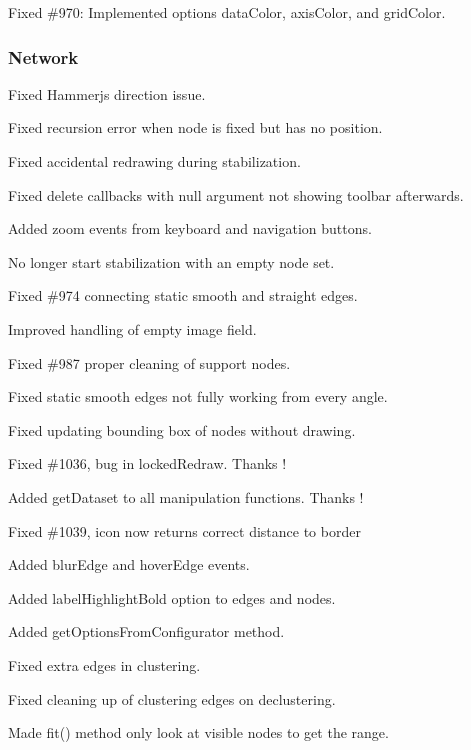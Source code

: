 \begin{DoxyItemize}
\item Fixed \#970\+: Implemented options {\ttfamily data\+Color}, {\ttfamily axis\+Color}, and {\ttfamily grid\+Color}.
\end{DoxyItemize}

\subsubsection*{Network}


\begin{DoxyItemize}
\item Fixed Hammerjs direction issue.
\item Fixed recursion error when node is fixed but has no position.
\item Fixed accidental redrawing during stabilization.
\item Fixed delete callbacks with null argument not showing toolbar afterwards.
\item Added zoom events from keyboard and navigation buttons.
\item No longer start stabilization with an empty node set.
\item Fixed \#974 connecting static smooth and straight edges.
\item Improved handling of empty image field.
\item Fixed \#987 proper cleaning of support nodes.
\item Fixed static smooth edges not fully working from every angle.
\item Fixed updating bounding box of nodes without drawing.
\item Fixed \#1036, bug in locked\+Redraw. Thanks !
\item Added get\+Dataset to all manipulation functions. Thanks !
\item Fixed \#1039, icon now returns correct distance to border
\item Added blur\+Edge and hover\+Edge events.
\item Added label\+Highlight\+Bold option to edges and nodes.
\item Added get\+Options\+From\+Configurator method.
\item Fixed extra edges in clustering.
\item Fixed cleaning up of clustering edges on declustering.
\item Made fit() method only look at visible nodes to get the range.
\end{DoxyItemize}

